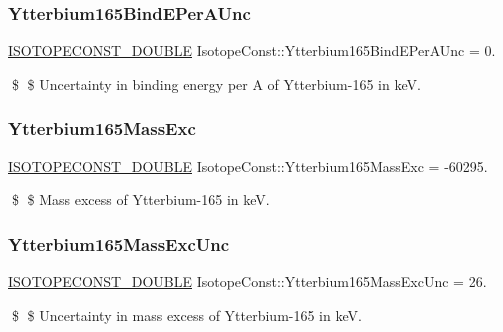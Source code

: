 \subsubsection{\texorpdfstring{Ytterbium165\+Bind\+E\+Per\+A\+Unc}{Ytterbium165BindEPerAUnc}}
{\footnotesize\ttfamily \mbox{\hyperlink{group___isotope_const-_macros_ga8f45a7272ce02c0b4c65c44636ed719a}{I\+S\+O\+T\+O\+P\+E\+C\+O\+N\+S\+T\+\_\+\+D\+O\+U\+B\+LE}} Isotope\+Const\+::\+Ytterbium165\+Bind\+E\+Per\+A\+Unc = 0.}

\$ \$ Uncertainty in binding energy per A of Ytterbium-\/165 in keV. \mbox{\label{group___isotope_const-_ytterbium-_yb165_gab659538273f0dd73fc4efc859d0a4b58}} 
\subsubsection{\texorpdfstring{Ytterbium165\+Mass\+Exc}{Ytterbium165MassExc}}
{\footnotesize\ttfamily \mbox{\hyperlink{group___isotope_const-_macros_ga8f45a7272ce02c0b4c65c44636ed719a}{I\+S\+O\+T\+O\+P\+E\+C\+O\+N\+S\+T\+\_\+\+D\+O\+U\+B\+LE}} Isotope\+Const\+::\+Ytterbium165\+Mass\+Exc = -\/60295.}

\$ \$ Mass excess of Ytterbium-\/165 in keV. \mbox{\label{group___isotope_const-_ytterbium-_yb165_ga101887d10f48a9453f545ccaef4787e8}} 
\subsubsection{\texorpdfstring{Ytterbium165\+Mass\+Exc\+Unc}{Ytterbium165MassExcUnc}}
{\footnotesize\ttfamily \mbox{\hyperlink{group___isotope_const-_macros_ga8f45a7272ce02c0b4c65c44636ed719a}{I\+S\+O\+T\+O\+P\+E\+C\+O\+N\+S\+T\+\_\+\+D\+O\+U\+B\+LE}} Isotope\+Const\+::\+Ytterbium165\+Mass\+Exc\+Unc = 26.}

\$ \$ Uncertainty in mass excess of Ytterbium-\/165 in keV. \mbox{\label{group___isotope_const-_ytterbium-_yb165_ga4a4cb62bb42b27efb98840947ae67bf0}} 
